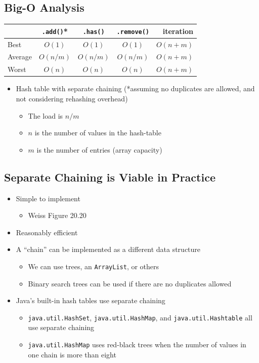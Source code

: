 \documentclass[10pt]{article}
\begin{document}
\subsection*{Big-O Analysis}
\begin{center}
    \begin{tabular}{lcccr}
        \toprule
        & \texttt{.add()}* & \texttt{.has()} & \texttt{.remove()} & iteration \\ \midrule
        Best & $O(1)$ & $O(1)$ & $O(1)$ & $O(n+m)$ \\
        Average & $O(n/m)$ & $O(n/m)$ & $O(n/m)$ & $O(n+m)$ \\
        Worst & $O(n)$ & $O(n)$ & $O(n)$ & $O(n+m)$ \\ \bottomrule
    \end{tabular}
\end{center}
\begin{itemize}
    \item Hash table with separate chaining (*assuming no duplicates are allowed, and not considering rehashing overhead)
    \begin{itemize}
        \item The load is $n/m$
        \item $n$ is the number of values in the hash-table
        \item $m$ is the number of entries (array capacity)
    \end{itemize}
\end{itemize}

\subsection*{Separate Chaining is Viable in Practice}
\begin{itemize}
    \item Simple to implement
    \begin{itemize}
        \item Weiss Figure 20.20
    \end{itemize}
    \item Reasonably efficient
    \item A ``chain'' can be implemented as a different data structure
    \begin{itemize}
        \item We can use trees, an \texttt{ArrayList}, or others
        \item Binary search trees can be used if there are no duplicates allowed
    \end{itemize}
    \item Java's built-in hash tables use separate chaining
    \begin{itemize}
        \item \texttt{java.util.HashSet}, \texttt{java.util.HashMap}, and \texttt{java.util.Hashtable} all use separate chaining
        \item \texttt{java.util.HashMap} uses red-black trees when the number of values in one chain is more than eight
    \end{itemize}
\end{itemize}
\end{document}
